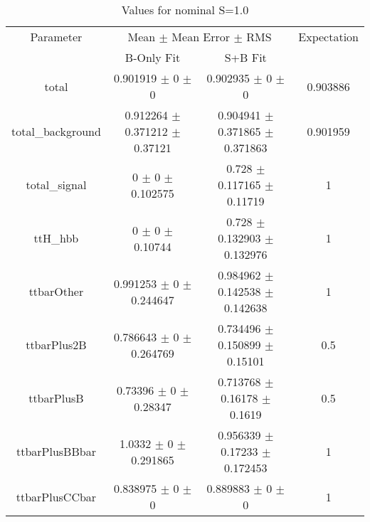 \begin{table}
\centering
\caption{Values for nominal S=1.0}
\begin{tabular}{cccc}
\toprule
Parameter & \multicolumn{2}{c}{Mean $\pm$ Mean Error $\pm$ RMS} & Expectation\\
 & B-Only Fit & S+B Fit & \\
\midrule
total & \num{0.901919} $\pm$ \num{0} $\pm$ \num{0} & \num{0.902935} $\pm$ \num{0} $\pm$ \num{0} & \num{0.903886}\\
total\_background & \num{0.912264} $\pm$ \num{0.371212} $\pm$ \num{0.37121} & \num{0.904941} $\pm$ \num{0.371865} $\pm$ \num{0.371863} & \num{0.901959}\\
total\_signal & \num{0} $\pm$ \num{0} $\pm$ \num{0.102575} & \num{0.728} $\pm$ \num{0.117165} $\pm$ \num{0.11719} & \num{1}\\
ttH\_hbb & \num{0} $\pm$ \num{0} $\pm$ \num{0.10744} & \num{0.728} $\pm$ \num{0.132903} $\pm$ \num{0.132976} & \num{1}\\
ttbarOther & \num{0.991253} $\pm$ \num{0} $\pm$ \num{0.244647} & \num{0.984962} $\pm$ \num{0.142538} $\pm$ \num{0.142638} & \num{1}\\
ttbarPlus2B & \num{0.786643} $\pm$ \num{0} $\pm$ \num{0.264769} & \num{0.734496} $\pm$ \num{0.150899} $\pm$ \num{0.15101} & \num{0.5}\\
ttbarPlusB & \num{0.73396} $\pm$ \num{0} $\pm$ \num{0.28347} & \num{0.713768} $\pm$ \num{0.16178} $\pm$ \num{0.1619} & \num{0.5}\\
ttbarPlusBBbar & \num{1.0332} $\pm$ \num{0} $\pm$ \num{0.291865} & \num{0.956339} $\pm$ \num{0.17233} $\pm$ \num{0.172453} & \num{1}\\
ttbarPlusCCbar & \num{0.838975} $\pm$ \num{0} $\pm$ \num{0} & \num{0.889883} $\pm$ \num{0} $\pm$ \num{0} & \num{1}\\
\bottomrule
\end{tabular}
\end{table}
